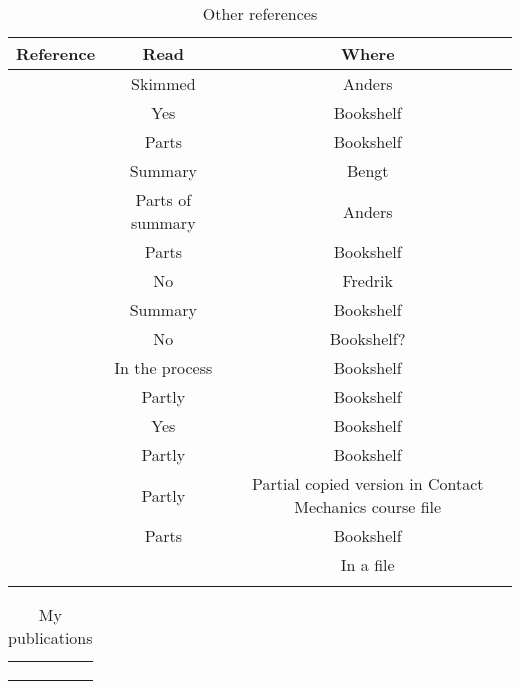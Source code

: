 \documentclass{article}
\begin{document}
\begin{table}
\caption{Other references}
\label{tab:other}
\centering
\begin{tabular}{c|c|c}
Reference & Read & Where\\ \hline
\citet{Lunden1991} & Skimmed & Anders \\
\citet{Wriggers2006book} & Yes & Bookshelf \\
\citet{DoneaHuerta2003book} & Parts & Bookshelf \\
\citet{Jergeus1998phd} & Summary & Bengt \\
\citet{Ahlstrom2001phd} & Parts of summary & Anders \\
\citet{Vernersson2006phd} & Parts & Bookshelf \\
\citet{Hakansson2007phd} & No & Fredrik \\
\citet{Caprioli2011lic} & Summary & Bookshelf \\
\citet{Petersson1999lic} & No & Bookshelf? \\
\citet{Brenner2008book} & In the process & Bookshelf \\
\citet{Johnson1987book} & Partly & Bookshelf \\
\citet{OttosenPetersson1992book} & Yes & Bookshelf \\
\citet{Nielsen2003} & Partly & Bookshelf \\
\citet{Timoshenko1951book} & Partly & Partial copied version in Contact Mechanics course file \\
\citet{Ziegler1983book} & Parts & Bookshelf \\
\citet{Hetnarski2008book} &  & In a file \\
\citet{CraigKurdila2006book} &  &  \\
\end{tabular}
\end{table}



\begin{table}
\caption{My publications}
\label{tab:mypublications}
\centering
\begin{tabular}{c}
\hline
\citet{Draganis2011} \\
\citet{Draganis2011lic} \\
\citet{Draganis2014} \\
\hline
\end{tabular}
\end{table}
\end{document}
